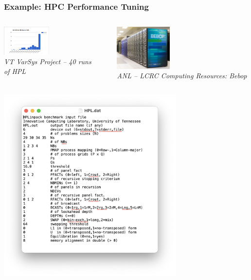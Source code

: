 \documentclass[aspectratio=169]{beamer}
\begin{document}
\begin{frame}\frametitle{Example: HPC Performance Tuning}
\begin{columns}
\begin{column}{0.45\textwidth}
\begin{center}
\includegraphics[width=0.5\textwidth]{../img/moo_old/varsys_hist.png}\\
{\tiny \sl
VT VarSys Project -- 40 runs of HPL
}
\end{center}
\end{column}
\begin{column}{0.1\textwidth}
$\quad$
\end{column}
\begin{column}{0.45\textwidth}
\begin{center}
\includegraphics[width=0.4\textwidth]{../img/probs/anl-bebop.png}\\
{\tiny \sl
ANL -- LCRC Computing Resources: Bebop
}
\end{center}
\end{column}
\end{columns}
\pause
\begin{columns}
\begin{column}{.3\textwidth}
\begin{center}
\includegraphics[width=0.7\textwidth]{../img/probs/hpl_dat.png}\\

\end{center}
\end{column}
\end{columns}
\end{frame}
\end{document}

